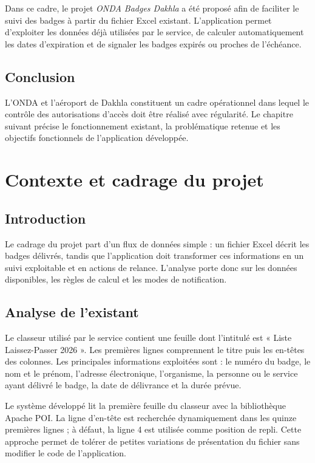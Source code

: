 \documentclass[12pt,a4paper,openany]{report}
\begin{document}
Dans ce cadre, le projet \textit{ONDA Badges Dakhla} a été proposé afin de
faciliter le suivi des badges à partir du fichier Excel existant. L'application
permet d'exploiter les données déjà utilisées par le service, de calculer
automatiquement les dates d'expiration et de signaler les badges expirés ou
proches de l'échéance.

\section{Conclusion}

L'ONDA et l'aéroport de Dakhla constituent un cadre opérationnel dans lequel le
contrôle des autorisations d'accès doit être réalisé avec régularité. Le
chapitre suivant précise le fonctionnement existant, la problématique retenue
et les objectifs fonctionnels de l'application développée.


\chapter{Contexte et cadrage du projet}

\section{Introduction}

Le cadrage du projet part d'un flux de données simple : un fichier Excel décrit
les badges délivrés, tandis que l'application doit transformer ces informations
en un suivi exploitable et en actions de relance. L'analyse porte donc sur les
données disponibles, les règles de calcul et les modes de notification.

\section{Analyse de l'existant}

Le classeur utilisé par le service contient une feuille dont l'intitulé est
« Liste Laissez-Passer 2026 ». Les premières lignes comprennent le titre puis
les en-têtes des colonnes. Les principales informations exploitées sont : le
numéro du badge, le nom et le prénom, l'adresse électronique, l'organisme, la
personne ou le service ayant délivré le badge, la date de délivrance et la durée
prévue.

Le système développé lit la première feuille du classeur avec la bibliothèque
Apache POI. La ligne d'en-tête est recherchée dynamiquement dans les quinze
premières lignes ; à défaut, la ligne 4 est utilisée comme position de repli.
Cette approche permet de tolérer de petites variations de présentation du
fichier sans modifier le code de l'application.
\end{document}
